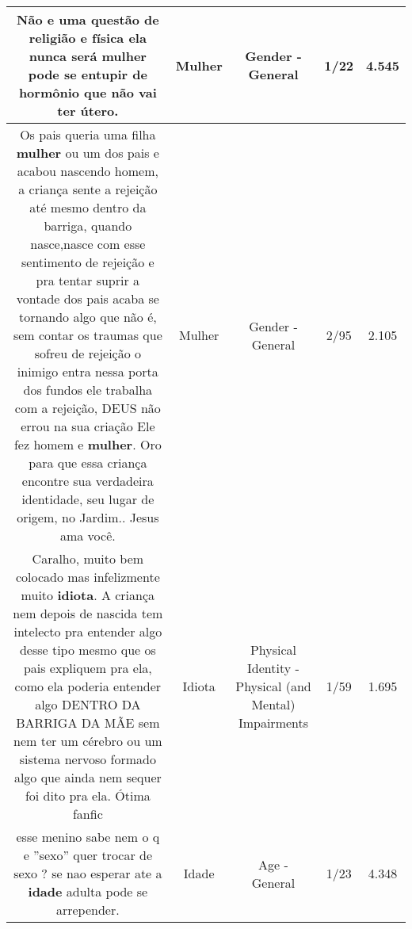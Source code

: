 \documentclass[11pt]{article}
\newlength\mylength
\begin{document}
\begin{center}
\begin{longtable}{|C{.65\mylength}|C{.30\mylength}|C{.12\mylength}|C{.12\mylength}|C{.12\mylength}|}
  \small Não e uma questão de religião e física ela nunca será \textbf{mulher} pode se entupir de hormônio que não vai ter útero.\normalsize   & Mulher & Gender - General & 1/22 & 4.545 \\  \hline
  \small Os pais queria uma filha \textbf{mulher} ou um dos pais e acabou nascendo homem, a criança sente a rejeição  até mesmo dentro da barriga, quando nasce,nasce com esse sentimento de rejeição e pra tentar suprir a vontade dos pais acaba se tornando algo que não é, sem contar os traumas que sofreu de rejeição o inimigo entra nessa porta dos fundos ele trabalha com a rejeição, DEUS não errou na sua criação Ele fez homem e \textbf{mulher}. Oro para que essa criança encontre sua verdadeira identidade, seu lugar de origem, no Jardim.. Jesus ama você.\normalsize   & Mulher & Gender - General & 2/95 & 2.105 \\  \hline
  \small Caralho, muito bem colocado mas infelizmente muito \textbf{idiota}. A criança nem depois de nascida tem intelecto pra entender algo desse tipo mesmo que os pais expliquem pra ela, como ela poderia entender algo DENTRO DA BARRIGA DA MÃE sem nem ter um cérebro ou um sistema nervoso formado algo que ainda nem sequer foi dito pra ela. Ótima fanfic\normalsize   & Idiota & Physical Identity - Physical (and Mental) Impairments & 1/59 & 1.695 \\  \hline
  \small esse menino sabe nem o q e ''sexo'' quer trocar de sexo ? se nao esperar ate a \textbf{idade} adulta pode se arrepender.\normalsize   & Idade & Age - General & 1/23 & 4.348 \\  \hline

\end{longtable}
\end{center}
\end{document}
